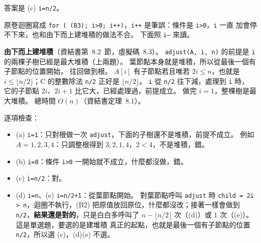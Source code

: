 \begin{pastsoln}
答案是 (c) \texttt{i=n/2}。

原卷迴圈寫成 \texttt{for ( (B3); i>0; i++)}，\texttt{i++} 是筆誤：條件是 \texttt{i>0}，\texttt{i} 一直
加會停不下來，也和由下而上建堆積的做法不合。 下面照 \texttt{i--} 來讀。

\textbf{由下而上建堆積}（資結書第~8.2~節，虛擬碼~8.3）。 \texttt{adjust(A, i, n)} 的前提是 \texttt{i}
的兩棵子樹已經是最大堆積（上兩題）。 葉節點本身就是堆積，所以從最後一個有子節點的位置開始，
往回做到根。 $A[i]$ 有子節點若且唯若 $2i \le n$，也就是 $i \le \lfloor n/2 \rfloor$；C 的整數除法
\texttt{n/2} 正好是 $\lfloor n/2 \rfloor$。 \texttt{i} 從 \texttt{n/2} 往下減，處理到 \texttt{i} 時，
它的子節點 $2i$、$2i+1$ 比它大，已經處理過，前提成立。 做完 $i = 1$，整棵樹是最大堆積。 總時間
$O(n)$（資結書定理~8.1）。

逐項檢查：
\begin{itemize}
\item (a) \texttt{i=1}：只對根做一次 \texttt{adjust}，下面的子樹還不是堆積，前提不成立。 例如
$A = 1, 2, 3, 4$：只調整根得到 $3, 2, 1, 4$，$2 < 4$，不是堆積，錯。
\item (b) \texttt{i=0}：條件 \texttt{i>0} 一開始就不成立，什麼都沒做，錯。
\item (c) \texttt{i=n/2}：對。
\item (d) \texttt{i=n}、(e) \texttt{i=n/2+1}：從葉節點開始。 對葉節點呼叫 \texttt{adjust} 時
\texttt{child = 2i > n}，迴圈不執行，(B2) 把原值放回原位，什麼都沒改；接著一樣會做到
\texttt{n/2}，\textbf{結果還是對的}，只是白白多呼叫了 $n - \lfloor n/2 \rfloor$ 次（(d)）或 $1$ 次（(e)）。 這是單選題，要選的是建堆積
真正的起點，也就是最後一個有子節點的位置 \texttt{n/2}，所以選 (c)，(d)(e) 不選。
\end{itemize}
\end{pastsoln}
